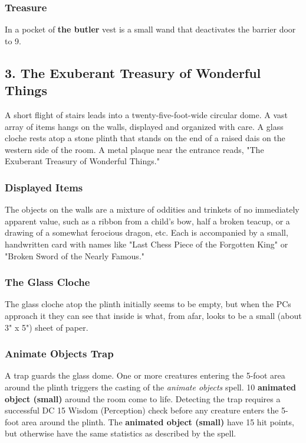 \documentclass[10pt,a4paper,twoside,bg=print,twocolumn,openany,nodeprecatedcode]{dndbook}
\begin{document}
\subsubsection{Treasure}
In a pocket of \textbf{the butler} vest is a small wand that deactivates the barrier door to 9.

\subsection{3. The Exuberant Treasury of Wonderful Things}
\begin{DndReadAloud}{}
A short flight of stairs leads into a twenty-five-foot-wide circular dome. A vast array of items hangs on the walls, displayed and organized with care. A glass cloche rests atop a stone plinth that stands on the end of a raised dais on the western side of the room. A metal plaque near the entrance reads, "The Exuberant Treasury of Wonderful Things."

\end{DndReadAloud}

\subsubsection{Displayed Items}
The objects on the walls are a mixture of oddities and trinkets of no immediately apparent value, such as a ribbon from a child's bow, half a broken teacup, or a drawing of a somewhat ferocious dragon, etc. Each is accompanied by a small, handwritten card with names like "Last Chess Piece of the Forgotten King" or "Broken Sword of the Nearly Famous."

\subsubsection{The Glass Cloche}
The glass cloche atop the plinth initially seems to be empty, but when the PCs approach it they can see that inside is what, from afar, looks to be a small (about 3" x 5") sheet of paper.

\subsubsection{Animate Objects Trap}
A trap guards the glass dome. One or more creatures entering the 5-foot area around the plinth triggers the casting of the \textit{animate objects} spell. 10 \textbf{animated object (small)} around the room come to life. Detecting the trap requires a successful DC 15 Wisdom (Perception) check before any creature enters the 5-foot area around the plinth. The \textbf{animated object (small)} have 15 hit points, but otherwise have the same statistics as described by the spell.
\end{document}
